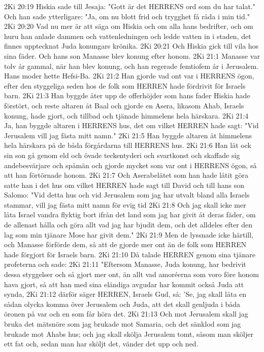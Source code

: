 2Ki 20:19  Hiskia sade till Jesaja: "Gott är det HERRENS ord som du har talat." Och han sade ytterligare: "Ja, om nu blott frid och trygghet få råda i min tid."
2Ki 20:20  Vad nu mer är att säga om Hiskia och om alla hans bedrifter, och om huru han anlade dammen och vattenledningen och ledde vatten in i staden, det finnes upptecknat Juda konungars krönika.
2Ki 20:21  Och Hiskia gick till vila hos sina fäder. Och hans son Manasse blev konung efter honom.
2Ki 21:1  Manasse var tolv år gammal, när han blev konung, och han regerade femtiofem år i Jerusalem. Hans moder hette Hefsi-Ba.
2Ki 21:2  Han gjorde vad ont var i HERRENS ögon, efter den styggeliga seden hos de folk som HERREN hade fördrivit för Israels barn.
2Ki 21:3  Han byggde åter upp de offerhöjder som hans fader Hiskia hade förstört, och reste altaren åt Baal och gjorde en Asera, likasom Ahab, Israels konung, hade gjort, och tillbad och tjänade himmelens hela härskara.
2Ki 21:4  Ja, han byggde altaren i HERRENS hus, det om vilket HERREN hade sagt: "Vid Jerusalem vill jag fästa mitt namn."
2Ki 21:5  Han byggde altaren åt himmelens hela härskara på de båda förgårdarna till HERRENS hus.
2Ki 21:6  Han lät ock sin son gå genom eld och övade teckentyderi och svartkonst och skaffade sig andebesvärjare och spåmän och gjorde mycket som var ont i HERRENS ögon, så att han förtörnade honom.
2Ki 21:7  Och Aserabelätet som han hade låtit göra satte han i det hus om vilket HERREN hade sagt till David och till hans son Salomo: "Vid detta hus och vid Jerusalem som jag har utvalt bland alla Israels stammar, vill jag fästa mitt namn för evig tid
2Ki 21:8  Och jag skall icke mer låta Israel vandra flyktig bort ifrån det land som jag har givit åt deras fäder, om de allenast hålla och göra allt vad jag har bjudit dem, och det alldeles efter den lag som min tjänare Mose har givit dem."
2Ki 21:9  Men de lyssnade icke härtill, och Manasse förförde dem, så att de gjorde mer ont än de folk som HERREN hade förgjort för Israels barn.
2Ki 21:10  Då talade HERREN genom sina tjänare profeterna och sade:
2Ki 21:11  "Eftersom Manasse, Juda konung, har bedrivit dessa styggelser och så gjort mer ont, än allt vad amoréerna som voro före honom hava gjort, så att han med sina eländiga avgudar har kommit också Juda att synda,
2Ki 21:12  därför säger HERREN, Israels Gud, så: 'Se, jag skall låta en sådan olycka komma över Jerusalem och Juda, att det skall genljuda i båda öronen på var och en som får höra det.
2Ki 21:13  Och mot Jerusalem skall jag bruka det mätsnöre som jag brukade mot Samaria, och det sänklod som jag brukade mot Ahabs hus; och jag skall skölja Jerusalem tomt, såsom man sköljer ett fat och, sedan man har sköljt det, vänder det upp och ned.
